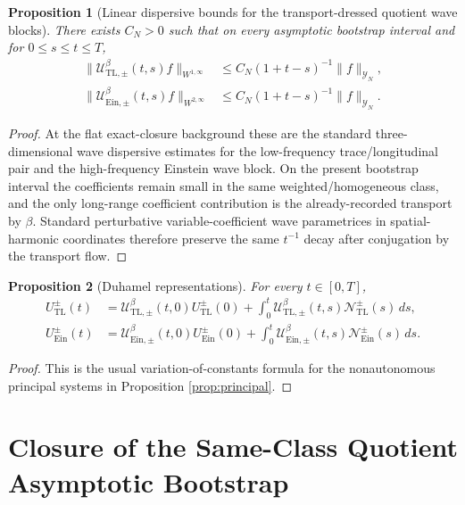 \documentclass[11pt]{article}
\newtheorem{proposition}{Proposition}
\begin{document}
\begin{proposition}[Linear dispersive bounds for the transport-dressed quotient wave blocks]
\label{prop:lin}
There exists \(C_N>0\) such that on every asymptotic bootstrap interval and for \(0\le s\le t\le T\),
\begin{align}
\|\mathcal U_{\mathrm{TL},\pm}^\beta(t,s)f\|_{W^{1,\infty}}
&\le
C_N(1+t-s)^{-1}\|f\|_{\mathcal Y_N},
\label{eq:linTL}
\\
\|\mathcal U_{\mathrm{Ein},\pm}^\beta(t,s)f\|_{W^{2,\infty}}
&\le
C_N(1+t-s)^{-1}\|f\|_{\mathcal Y_N}.
\label{eq:linEin}
\end{align}
\end{proposition}

\begin{proof}
At the flat exact-closure background these are the standard three-dimensional wave dispersive estimates for the low-frequency trace/longitudinal pair and the high-frequency Einstein wave block. On the present bootstrap interval the coefficients remain small in the same weighted/homogeneous class, and the only long-range coefficient contribution is the already-recorded transport by \(\beta\). Standard perturbative variable-coefficient wave parametrices in spatial-harmonic coordinates therefore preserve the same \(t^{-1}\) decay after conjugation by the transport flow.
\end{proof}

\begin{proposition}[Duhamel representations]
\label{prop:duhamel}
For every \(t\in[0,T]\),
\begin{align}
U_{\mathrm{TL}}^\pm(t)
&=
\mathcal U_{\mathrm{TL},\pm}^\beta(t,0)U_{\mathrm{TL}}^\pm(0)
+\int_0^t \mathcal U_{\mathrm{TL},\pm}^\beta(t,s)\mathcal N_{\mathrm{TL}}^\pm(s)\,ds,
\label{eq:duhTL}
\\
U_{\mathrm{Ein}}^\pm(t)
&=
\mathcal U_{\mathrm{Ein},\pm}^\beta(t,0)U_{\mathrm{Ein}}^\pm(0)
+\int_0^t \mathcal U_{\mathrm{Ein},\pm}^\beta(t,s)\mathcal N_{\mathrm{Ein}}^\pm(s)\,ds.
\label{eq:duhEin}
\end{align}
\end{proposition}

\begin{proof}
This is the usual variation-of-constants formula for the nonautonomous principal systems in Proposition \ref{prop:principal}.
\end{proof}

\section{Closure of the Same-Class Quotient Asymptotic Bootstrap}
\end{document}
